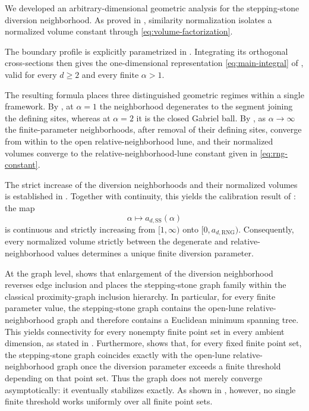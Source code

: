 \documentclass[a4paper,fleqn]{cas-dc}
\theoremstyle{definition}
\theoremstyle{remark}
\newcommand{\0}{\mathbf{0}}
\begin{document}
We developed an arbitrary-dimensional geometric analysis
for the
stepping-stone diversion neighborhood. As proved in
, similarity normalization isolates a normalized
volume constant through \eqref{eq:volume-factorization}.

The boundary profile is explicitly parametrized in
. Integrating its orthogonal
cross-sections then gives the one-dimensional representation
\eqref{eq:main-integral} of , valid for every
$d\geq2$ and every finite $\alpha>1$.

The resulting formula places three distinguished geometric regimes within
a single framework. By , at $\alpha=1$ the
neighborhood degenerates to the segment joining the defining sites, whereas
at $\alpha=2$ it is the closed Gabriel ball. By
, as $\alpha\to\infty$ the finite-parameter
neighborhoods, after removal of their defining sites, converge from within
to the open relative-neighborhood lune, and their normalized volumes
converge to the relative-neighborhood-lune constant given in
\eqref{eq:rng-constant}.

The strict increase of the diversion neighborhoods and their normalized
volumes is established in . Together with
continuity, this yields the calibration result of
: the map
\begin{equation}
\alpha\longmapsto a_{d,\mathrm{SS}}(\alpha)
\end{equation}
is continuous and strictly increasing from $[1,\infty)$ onto
$[0,a_{d,\mathrm{RNG}})$. Consequently, every normalized volume strictly
between the degenerate and relative-neighborhood values determines a unique
finite diversion parameter.

At the graph level,  shows that enlargement of the
diversion neighborhood reverses edge inclusion and places the stepping-stone
graph family within the classical proximity-graph inclusion hierarchy. In particular, for every finite parameter value, the stepping-stone graph contains the open-lune
relative-neighborhood graph and therefore contains a Euclidean minimum
spanning tree. This yields connectivity for every nonempty finite point set
in every ambient dimension, as stated in .
Furthermore,  shows that, for every fixed
finite point set, the stepping-stone graph coincides exactly with the
open-lune relative-neighborhood graph once the diversion parameter exceeds
a finite threshold depending on that point set. Thus the graph does not
merely converge asymptotically: it eventually stabilizes exactly. As shown
in , however, no single finite threshold
works uniformly over all finite point sets.
\end{document}
